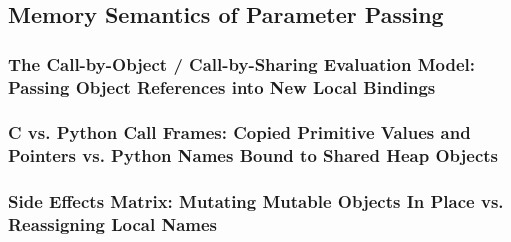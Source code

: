 \subsection{Memory Semantics of Parameter Passing}
\subsubsection{The Call-by-Object / Call-by-Sharing Evaluation Model: Passing Object References into New Local Bindings}
\subsubsection{C vs. Python Call Frames: Copied Primitive Values and Pointers vs. Python Names Bound to Shared Heap Objects}
\subsubsection{Side Effects Matrix: Mutating Mutable Objects In Place vs. Reassigning Local Names}
